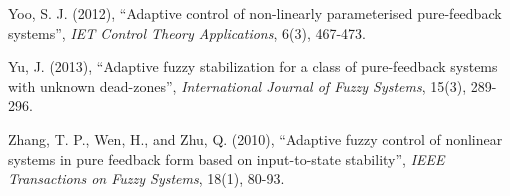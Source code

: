 \documentclass{tSYS2e}
\theoremstyle{plain}
\theoremstyle{definition}
\begin{document}
\begin{thebibliography}{99}
 Yoo, S. J. (2012), ``Adaptive control of
non-linearly parameterised pure-feedback systems'', {\itshape IET Control Theory 
Applications}, 6(3), 467-473.

 Yu, J. (2013), ``Adaptive fuzzy stabilization for a
class of pure-feedback systems with unknown dead-zones'', {\itshape International
Journal of Fuzzy Systems}, 15(3), 289-296.

 Zhang, T. P., Wen, H., and
Zhu, Q. (2010), ``Adaptive fuzzy control of nonlinear systems in pure feedback
form based on input-to-state stability'', {\itshape IEEE Transactions on Fuzzy Systems},
18(1), 80-93.
\end{thebibliography}
\end{document}
